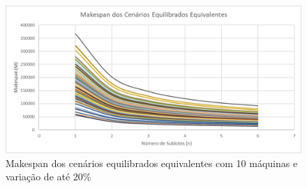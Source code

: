 \begin{figure}[!ht]
    \centering
    \includegraphics[width=12cm]{Resultados/Figuras/Meq10_20}
    \caption{Makespan dos cenários equilibrados equivalentes com 10 máquinas e variação de até 20\%}
    \label{fig:Meq10_20}
\end{figure}